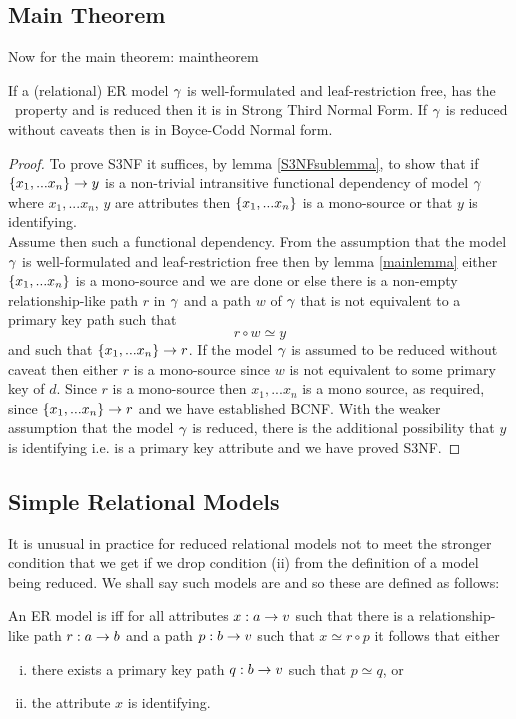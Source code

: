 \subsection{Main Theorem}
\noindent Now for the main theorem:
maintheorem
\begin{theorem}
\noindent If a (relational) ER model $\gamma$ is well-formulated and leaf-restriction free, has the \fdfactoring\ property and is reduced then it is in Strong Third Normal Form. 
If  $\gamma$ is reduced without caveats then is in Boyce-Codd Normal form.
\end{theorem}
\begin{proof}
To prove S3NF it suffices, by lemma \ref{S3NFsublemma},  to show that if 
$\left\{x_1,...x_n\right\} \rightarrow y$ is a non-trivial intransitive functional dependency of model $\gamma$
where $x_1,...x_n$, $y$ are attributes 
then  $\left\{x_1,...x_n\right\}$ is a mono-source or that $y$ is identifying. \\
Assume then such a functional dependency.
From the assumption that the model $\gamma$ is well-formulated and leaf-restriction free
then by lemma \ref{mainlemma} 
either $\left\{x_1,...x_n\right\}$ is a mono-source and we are done
or else there is a non-empty relationship-like path $r$ in $\gamma$
and a path $w$ of $\gamma$ that is not  equivalent to a primary key path such that
\begin{equation}
\label{simpleRepresentation}
 r \circ w \simeq y
\end{equation}
and such that $\left\{x_1,...x_n\right\} \rightarrow r$.
If the model $\gamma$ is assumed to be reduced without caveat then either $r$ is a mono-source since $w$ is not equivalent to some primary key of $d$.
Since $r$ is a mono-source then $x_1,...x_n$ is a mono source, as required, since $\left\{x_1,...x_n\right\} \rightarrow r$  and we have established BCNF.
With the weaker assumption that the model $\gamma$ is reduced, there is the additional possibility that $y$ is identifying i.e. is a primary key attribute and we have proved S3NF.
\end{proof}

\subsection{Simple Relational Models}
It is unusual in practice for reduced relational models not to meet the stronger condition that we get if we drop condition (ii) from the definition of a model being reduced. We shall say such models are  and so these are defined as follows:
\begin{definition} 
An  ER model is  iff for all attributes $x:a \rightarrow v$
such that there is a relationship-like path $r:a \rightarrow b$ and a path $p:b \rightarrow v$ such that
$x \simeq r \circ p$ it follows that 
either 
\begin{enumerate} [(i)]
\item there exists a primary key path  $q:b \rightarrow v$ such that $p \simeq q$, or
\item the attribute $x$ is identifying.
\end{enumerate}
\end{definition}

